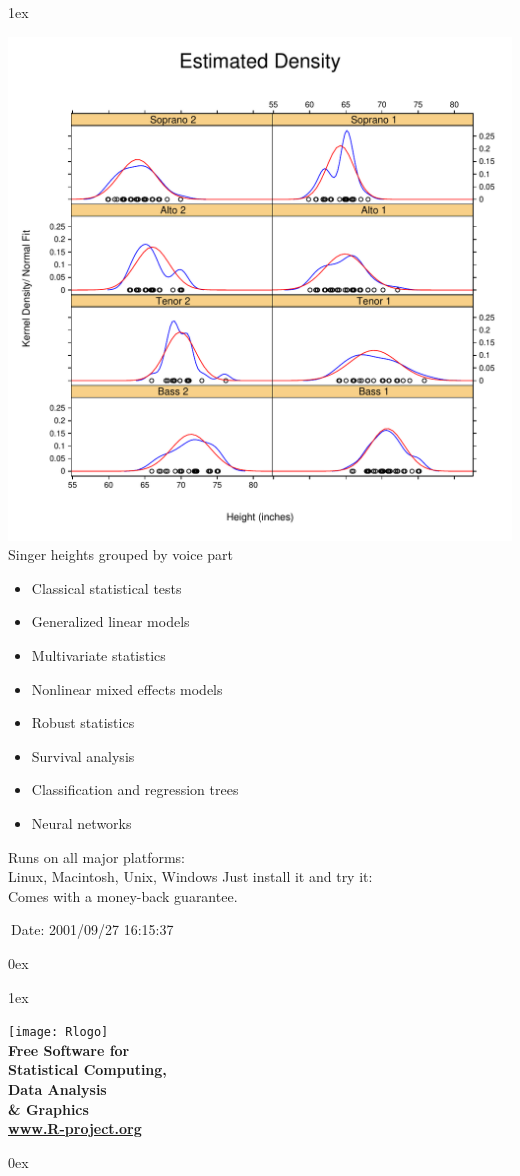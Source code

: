 \documentclass[landscape]{article}
\newlength{\colw}
\newcommand{\column}[1]{\hspace*{9mm}{}
  \parbox[t][0.99\textheight][t]{\colw}{\parskip1ex
    #1\parskip0ex}\hspace{9mm}{}}
\begin{document}
\column{
  \begin{center}
    \footnotesize\sf
    \includegraphics[width=\colw]{lattice-density}
    Singer heights grouped by voice part
  \end{center}

  \vfill
  \flushleft
  \begin{itemize}
   \item Classical statistical tests
   \item Generalized linear models
   \item Multivariate statistics
   \item Nonlinear mixed effects models
   \item Robust statistics
   \item Survival analysis
   \item Classification and regression trees
   \item Neural networks
  \end{itemize}
  \vfill
  Runs on all major platforms:\\
  Linux, Macintosh, Unix, Windows
  \vfill
  Just install it and try it:\\  Comes with a money-back guarantee.

  \begin{flushright}\tiny
   $\ $Date: 2001/09/27 16:15:37 $\ $
  \end{flushright}
}
\column{
    \vfill
  \begin{center}
    \texttt{[image: Rlogo]}\\[2cm]
    \bf
    \Large
    Free Software for\\[1cm]
    \Huge
    Statistical Computing,\\ Data Analysis\\ \& Graphics\\[1cm]
    \Large
    \url{www.R-project.org}
  \end{center}
  \vfill
  }
\end{document}
